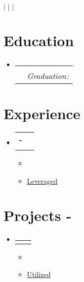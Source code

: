 \documentclass[letterpaper,11pt]{article}
\makeatletter
\newcommand{\resumeItem}[1]{
  \item\small{
    {#1 \vspace{-2pt}}
  }
}
\newcommand{\resumeSubheading}[4]{
  \vspace{-2pt}\item
    \begin{tabular*}{0.97\textwidth}[t]{l@{\extracolsep{\fill}}r}
      \textbf{#1} & #2 \\
      \textit{\small#3} & \textit{\small #4} \\
    \end{tabular*}\vspace{-7pt}
}
\newcommand{\resumeProjectHeading}[2]{
    \item
    \begin{tabular*}{0.97\textwidth}{l@{\extracolsep{\fill}}r}
      \small#1 & #2 \\
    \end{tabular*}\vspace{-7pt}
}
\newcommand{\resumeSubHeadingListStart}{\begin{itemize}[leftmargin=0.15in, label={}]}
\newcommand{\resumeSubHeadingListEnd}{\end{itemize}}
\newcommand{\resumeItemListStart}{\begin{itemize}}
\newcommand{\resumeItemListEnd}{\end{itemize}\vspace{-5pt}}
\makeatother
\begin{document}

\begin{center}
    \textbf{\Huge \scshape {}} \\ \vspace{1pt}
    \small {} $|$ \href{mailto:\VAR{contact.email}}{\ul{}} $|$
    \href{\VAR{contact.linkedin}}{\ul{}} $|$
    \href{\VAR{contact.repo}}{\ul{}}
\end{center}


\section{Education}
  \resumeSubHeadingListStart
    \resumeSubheading
      {\VAR{school.name}}{\VAR{school.location}}
      {\VAR{school.description}}{Graduation: \VAR{school.graduation}}
  \resumeSubHeadingListEnd


\section{Experience}
  \resumeSubHeadingListStart

    \resumeSubheading
      {\VAR{job.employer} - \VAR{job.title}}{\VAR{job.duration}}
      {\VAR{job.location}}{}
      \resumeItemListStart
        \resumeItem{}
        \resumeItem{\ul{Leveraged} }
      \resumeItemListEnd
      
  \resumeSubHeadingListEnd


\section{Projects - }
    \resumeSubHeadingListStart
      \resumeProjectHeading
          {\textbf{\VAR{project.name}}}{\VAR{project.duration}}
          \resumeItemListStart
            \resumeItem{}
            \resumeItem{\ul{Utilized} }
          \resumeItemListEnd
    \resumeSubHeadingListEnd
\end{document}

